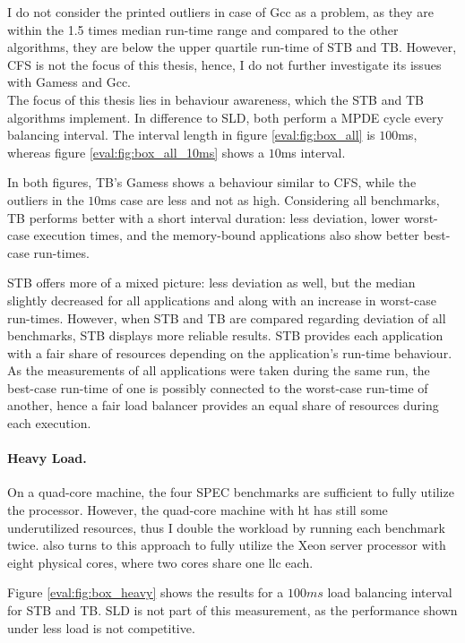 I do not consider the printed outliers in case of Gcc as a problem, as
they are within the 1.5 times median run-time range and compared to the other
algorithms, they are below the upper quartile run-time of STB and TB.
However, CFS is not the focus of this thesis, hence, I do not further
investigate its issues with Gamess and Gcc.
\\

The focus of this thesis lies in behaviour awareness, which the STB and TB
algorithms implement.
In difference to SLD, both perform a MPDE cycle every balancing interval.
The interval length in figure \ref{eval:fig:box_all} is $100$ms, whereas figure
\ref{eval:fig:box_all_10ms} shows a $10$ms interval.

In both figures, TB's Gamess shows a behaviour similar to CFS, while the
outliers in the $10$ms case are less and not as high.
Considering all benchmarks, TB performs better with a short interval duration:
less deviation, lower worst-case execution times, and the memory-bound
applications also show better best-case run-times.

STB offers more of a mixed picture: less deviation as well, but the median
slightly decreased for all applications and along with an increase in
worst-case run-times.
However, when STB and TB are compared regarding deviation of all benchmarks,
STB displays more reliable results.
STB provides each application with a fair share of resources depending on the
application's run-time behaviour.
As the measurements of all applications were taken during the same run, the
best-case run-time of one is possibly connected to the worst-case run-time of
another, hence a fair load balancer provides an equal share of resources
during each execution.


\paragraph{Heavy Load.}
On a quad-core machine, the four SPEC benchmarks are sufficient to fully
utilize the processor.
However, the quad-core machine with \gls{ht} has still some underutilized
resources, thus I double the workload by running each benchmark twice.
\cite{zhuravlev_addressing_2010} also turns to this approach to fully utilize
the Xeon server processor with eight physical cores, where two cores share
one \gls{llc} each.

Figure \ref{eval:fig:box_heavy} shows the results for a $100ms$ load balancing
interval for STB and TB. SLD is not part of this measurement, as the
performance shown under less load is not competitive.

